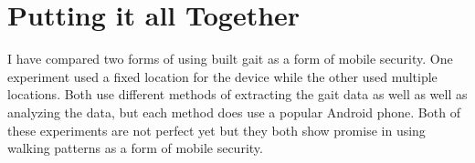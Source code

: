 \documentclass{sig-alternate}
\begin{document}
\section{Putting it all Together}
I have compared two forms of using built gait as a form of mobile security. One experiment used a fixed location for the device while the other used multiple locations. Both use different methods of extracting the gait data as well as well as analyzing the data, but each method does use a popular Android phone. Both of these experiments are not perfect yet but they both show promise in using walking patterns as a form of mobile security.
\end{document}

